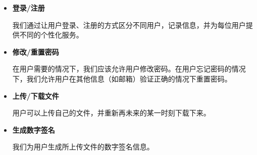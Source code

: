\begin{itemize}
	
	\item \textbf{登录/注册}
	
	我们通过让用户登录、注册的方式区分不同用户，记录信息，并为每位用户提供不同的个性化服务。
	
	\item \textbf{修改/重置密码}
	
	在用户需要的情况下，我们应该允许用户修改密码。在用户忘记密码的情况下，我们允许用户在其他信息（如邮箱）验证正确的情况下重置密码。
	
	\item \textbf{上传/下载文件}
	
	用户可以上传自己的文件，并重新再未来的某一时刻下载下来。
	
	\item \textbf{生成数字签名}
	
	我们为用户生成所上传文件的数字签名信息。

\end{itemize}

